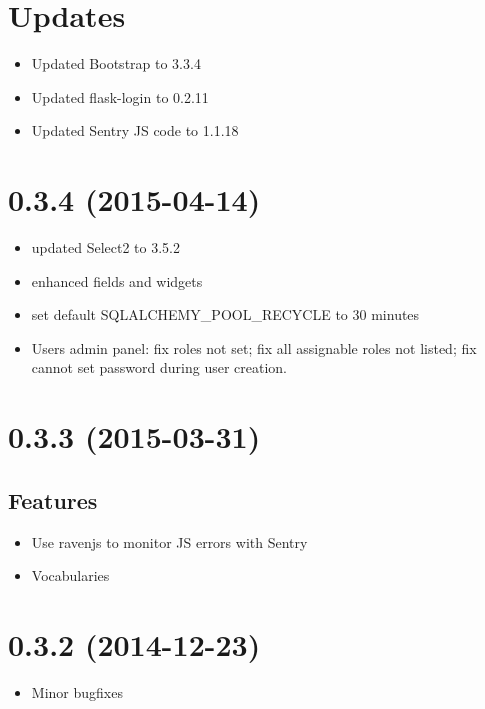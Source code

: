 \documentclass[a4paper,12pt,english]{sphinxmanual}
\begin{document}
\section{Updates}
\label{changelog:updates}\begin{itemize}
\item {} 
Updated Bootstrap to 3.3.4

\item {} 
Updated flask-login to 0.2.11

\item {} 
Updated Sentry JS code to 1.1.18

\end{itemize}


\section{0.3.4 (2015-04-14)}
\label{changelog:id2}\begin{itemize}
\item {} 
updated Select2 to 3.5.2

\item {} 
enhanced fields and widgets

\item {} 
set default SQLALCHEMY\_POOL\_RECYCLE to 30 minutes

\item {} 
Users admin panel: fix roles not set; fix all assignable roles not listed; fix
cannot set password during user creation.

\end{itemize}


\section{0.3.3 (2015-03-31)}
\label{changelog:id3}

\subsection{Features}
\label{changelog:id4}\begin{itemize}
\item {} 
Use ravenjs to monitor JS errors with Sentry

\item {} 
Vocabularies

\end{itemize}


\section{0.3.2 (2014-12-23)}
\label{changelog:id5}\begin{itemize}
\item {} 
Minor bugfixes

\end{itemize}
\end{document}
